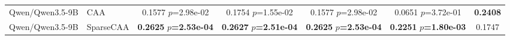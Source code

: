 \begin{table}[ht]
\begin{tabular}{ll c c c c c}
        Qwen/Qwen3.5-9B & CAA & \shortstack{0.1577\\{\scriptsize $p$=2.98e-02}} & \shortstack{0.1754\\{\scriptsize $p$=1.55e-02}} & \shortstack{0.1577\\{\scriptsize $p$=2.98e-02}} & \shortstack{0.0651\\{\scriptsize $p$=3.72e-01}} & \textbf{0.2408} \\
        Qwen/Qwen3.5-9B & SparseCAA & \shortstack{\textbf{0.2625}\\{\scriptsize \textbf{$p$=2.53e-04}}} & \shortstack{\textbf{0.2627}\\{\scriptsize \textbf{$p$=2.51e-04}}} & \shortstack{\textbf{0.2625}\\{\scriptsize \textbf{$p$=2.53e-04}}} & \shortstack{\textbf{0.2251}\\{\scriptsize \textbf{$p$=1.80e-03}}} & 0.1747 \\
        \bottomrule
    \end{tabular}
\end{table}
